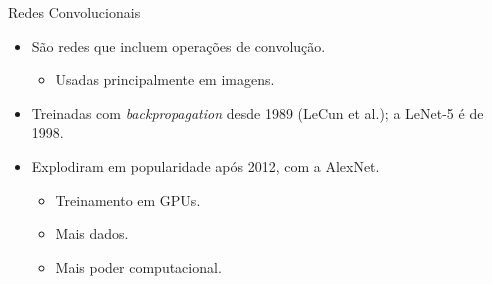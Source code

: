 \documentclass[aspectratio=169,xcolor=dvipsnames]{beamer}
\begin{document}
\begin{frame}{Redes Convolucionais}
\begin{itemize}
    \item São redes que incluem operações de convolução.
    \begin{itemize}
        \item Usadas principalmente em imagens.
    \end{itemize}
    \item Treinadas com \textit{backpropagation} desde 1989 (LeCun et al.); a LeNet-5 é de 1998.
    \item Explodiram em popularidade após 2012, com a AlexNet.
    \begin{itemize}
        \item Treinamento em GPUs.
        \item Mais dados.
        \item Mais poder computacional.
    \end{itemize}
\end{itemize}
\end{frame}
\end{document}
